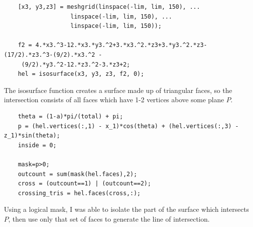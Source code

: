 \documentclass{article}
\begin{document}
	\begin{verbatim}
    [x3, y3,z3] = meshgrid(linspace(-lim, lim, 150), ...
                   linspace(-lim, lim, 150), ...
                   linspace(-lim, lim, 150));

    f2 = 4.*x3.^3-12.*x3.*y3.^2+3.*x3.^2.*z3+3.*y3.^2.*z3-(17/2).*z3.^3-(9/2).*x3.^2 -   
     (9/2).*y3.^2-12.*z3.^2-3.*z3+2;
    hel = isosurface(x3, y3, z3, f2, 0);
\end{verbatim}
	
	The isosurface function creates a surface made up of triangular faces, so the intersection consists of all faces which have 1-2 vertices above some plane $P$.
	

	
	\begin{verbatim}
    theta = (1-a)*pi/(total) + pi;
    p = (hel.vertices(:,1) - x_1)*cos(theta) + (hel.vertices(:,3) - z_1)*sin(theta);
    inside = 0;
    
    mask=p>0;
    outcount = sum(mask(hel.faces),2);
    cross = (outcount==1) | (outcount==2);
    crossing_tris = hel.faces(cross,:);
    \end{verbatim}
	Using a logical mask, I was able to isolate the part of the surface which intersects $P$, then use only that set of faces to generate the line of intersection. 
	

	
\end{document}
